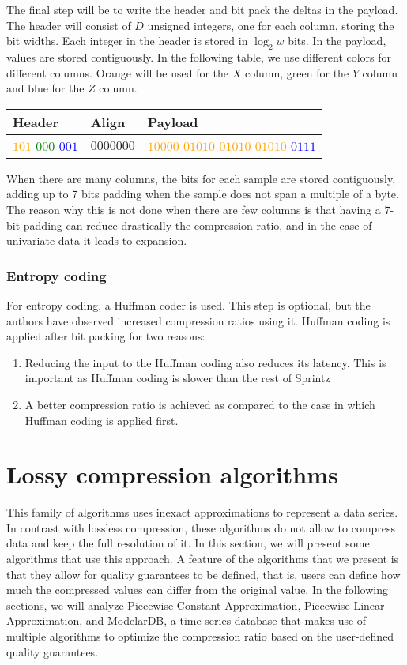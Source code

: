 The final step will be to write the header and bit pack the deltas in the payload.
The header will consist of $D$ unsigned integers, one for each column, storing the bit widths.
Each integer in the header is stored in $\log_2{w}$ bits.
In the payload, values are stored contiguously.
In the following table, we use different colors for different columns. Orange will be used
for the $X$ column, green for the $Y$ column and blue for the $Z$ column.

\begin{table}[!htbp]
\centering
\begin{tabular}{l|l|l}
\textbf{Header} & \textbf{Align} & \textbf{Payload} \\ 
\hline
\textcolor{orange}{$101$} \textcolor{green}{$000$} \textcolor{blue}{$001$} & $0000000$ & \textcolor{orange}{$10000$ $01010$ $01010$ $01010$} \textcolor{blue}{$0111$} \\
\end{tabular}
\end{table}

When there are many columns, the bits for each sample are stored contiguously, adding up to
7 bits padding when the sample does not span a multiple of a byte. The reason why this is
not done when there are few columns is that having a 7-bit padding can reduce drastically
the compression ratio, and in the case of univariate data it leads to expansion.

\subsubsection{Entropy coding}
For entropy coding, a Huffman coder is used. This step is optional, but the authors have
observed increased compression ratios using it. Huffman coding is applied after bit packing
for two reasons:
\begin{enumerate}
    \item Reducing the input to the Huffman coding also reduces its latency. This is
    important as Huffman coding is slower than the rest of Sprintz
    \item A better compression ratio is achieved as compared to the case in which Huffman
    coding is applied first.
\end{enumerate}

\section{Lossy compression algorithms}
This family of algorithms uses inexact approximations to represent a data series. In
contrast with lossless compression, these algorithms do not allow to compress data and
keep the full resolution of it. In this section, we will present some algorithms that use
this approach. A feature of the algorithms that we present is that they allow for quality
guarantees to be defined, that is, users can define how much the compressed values can differ
from the original value. In the following sections, we will analyze Piecewise Constant
Approximation, Piecewise Linear Approximation, and ModelarDB, a time series database that
makes use of multiple algorithms to optimize the compression ratio based on the user-defined
quality guarantees.

